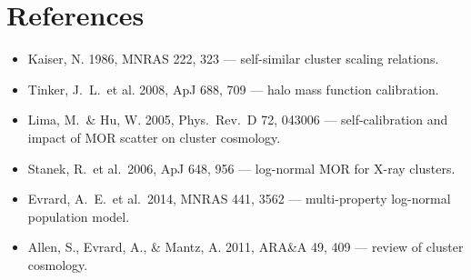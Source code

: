 \documentclass[11pt,a4paper]{article}
\begin{document}
\section{References}

\begin{itemize}
    \item Kaiser, N. 1986, MNRAS 222, 323 --- self-similar cluster
          scaling relations.
    \item Tinker, J.~L.\ et al. 2008, ApJ 688, 709 --- halo mass
          function calibration.
    \item Lima, M.\ \& Hu, W. 2005, Phys.\ Rev.\ D 72, 043006 ---
          self-calibration and impact of MOR scatter on cluster
          cosmology.
    \item Stanek, R.\ et al.\ 2006, ApJ 648, 956 --- log-normal MOR
          for X-ray clusters.
    \item Evrard, A.~E.\ et al.\ 2014, MNRAS 441, 3562 ---
          multi-property log-normal population model.
    \item Allen, S., Evrard, A., \& Mantz, A. 2011, ARA\&A 49, 409 ---
          review of cluster cosmology.
\end{itemize}
\end{document}
